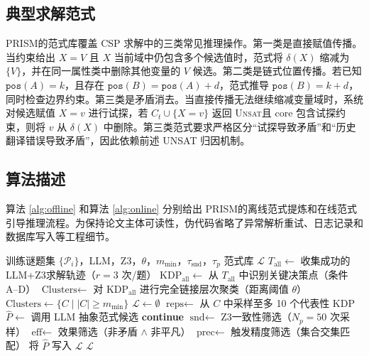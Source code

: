 \documentclass[UTF8,a4paper,12pt]{ctexart}
\newcommand{\PRISM}{PRISM}
\newcommand{\unsat}{\textsc{Unsat}}
\newcommand{\zthree}{Z3}
\begin{document}
\subsection{典型求解范式}

\PRISM 的范式库覆盖 CSP 求解中的三类常见推理操作。第一类是直接赋值传播。当约束给出 \(X=V\) 且 \(X\) 当前域中仍包含多个候选值时，范式将 \(\delta(X)\) 缩减为 \(\{V\}\)，并在同一属性类中删除其他变量的 \(V\) 候选。第二类是链式位置传播。若已知 \(\texttt{pos}(A)=k\)，且存在 \(\texttt{pos}(B)=\texttt{pos}(A)+d\)，范式推导 \(\texttt{pos}(B)=k+d\)，同时检查边界约束。第三类是矛盾消去。当直接传播无法继续缩减变量域时，系统对候选赋值 \(X=v\) 进行试探，若 \(C_t\cup\{X=v\}\) 返回 \unsat 且 core 包含试探约束，则将 \(v\) 从 \(\delta(X)\) 中删除。第三类范式要求严格区分“试探导致矛盾”和“历史翻译错误导致矛盾”，因此依赖前述 UNSAT 归因机制。

\subsection{算法描述}

算法 \ref{alg:offline} 和算法 \ref{alg:online} 分别给出 \PRISM 的离线范式提炼和在线范式引导推理流程。为保持论文主体可读性，伪代码省略了异常解析重试、日志记录和数据库写入等工程细节。

\begin{algorithm}[t]
\caption{\PRISM 离线范式提炼流程。}
\label{alg:offline}
\begin{algorithmic}[1]
\REQUIRE 训练谜题集 \(\{\mathcal{P}_i\}\)，LLM，\zthree，\(\theta\)，\(m_{\min}\)，\(\tau_{\text{snd}}\)，\(\tau_p\)
\ENSURE 范式库 \(\mathcal{L}\)
\STATE \(T_{\text{all}} \leftarrow\) 收集成功的 LLM+\zthree 求解轨迹（\(r=3\) 次/题）
\STATE \(\text{KDP}_{\text{all}} \leftarrow\) 从 \(T_{\text{all}}\) 中识别关键决策点（条件 A–D）
\STATE \(\text{Clusters} \leftarrow\) 对 \(\text{KDP}_{\text{all}}\) 进行完全链接层次聚类（距离阈值 \(\theta\)）
\STATE \(\text{Clusters} \leftarrow \{C \mid |C| \geq m_{\min}\}\)
\STATE \(\mathcal{L} \leftarrow \emptyset\)
  \STATE \(\text{reps} \leftarrow\) 从 \(C\) 中采样至多 10 个代表性 KDP
  \STATE \(\hat{P} \leftarrow\) 调用 LLM 抽象范式候选
    \STATE \textbf{continue}
  \ENDIF
  \STATE \(\text{snd} \leftarrow\) \zthree 一致性筛选（\(N_p=50\) 次采样）
  \STATE \(\text{eff} \leftarrow\) 效果筛选（非矛盾 \(\wedge\) 非平凡）
  \STATE \(\text{prec} \leftarrow\) 触发精度筛选（集合交集匹配）
    \STATE 将 \(\hat{P}\) 写入 \(\mathcal{L}\)
  \ENDIF
\ENDFOR
\RETURN \(\mathcal{L}\)
\end{algorithmic}
\end{algorithm}
\end{document}
